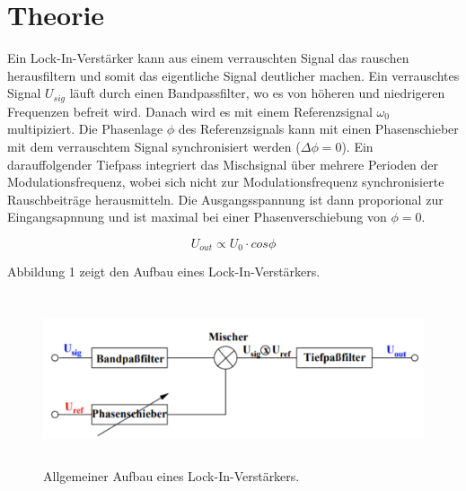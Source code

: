 \section{Theorie}
\label{sec:Theorie}

Ein Lock-In-Verstärker kann aus einem verrauschten Signal das rauschen herausfiltern und somit
das eigentliche Signal deutlicher machen. Ein verrauschtes Signal $U_{sig}$ läuft durch einen Bandpassfilter, wo es
von höheren und niedrigeren Frequenzen befreit wird. Danach wird es mit einem Referenzsignal $\omega_0$
multipiziert. Die Phasenlage $\phi$ des Referenzsignals kann mit einen Phasenschieber mit dem
verrauschtem Signal synchronisiert werden ($\Delta \phi = 0$). Ein darauffolgender Tiefpass integriert das Mischsignal
über mehrere Perioden der Modulationsfrequenz, wobei sich nicht zur Modulationsfrequenz synchronisierte Rauschbeiträge herausmitteln.
Die Ausgangsspannung ist dann proporional zur Eingangsapnnung und ist maximal bei einer Phasenverschiebung von $\phi = 0$.

\begin{equation}
  U_{out} \propto U_0 \cdot cos{\phi}
\end{equation}


Abbildung 1 zeigt den Aufbau eines Lock-In-Verstärkers.

\begin{figure}[H]
  \centering
  \includegraphics[height=5cm]{Lock.PNG}
  \caption{Allgemeiner Aufbau eines Lock-In-Verstärkers. \cite{sample}}
  \label{fig:Lock}
\end{figure}
